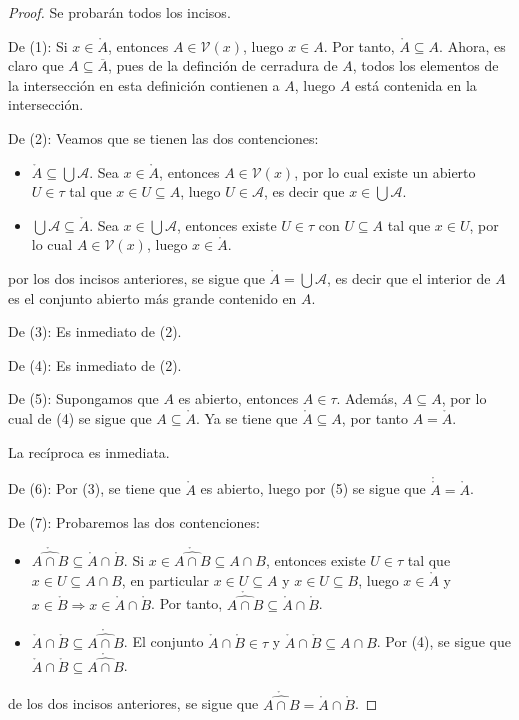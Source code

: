 \documentclass[12pt]{report}
\theoremstyle{largebreak}
\newcommand{\V}[1]{\ensuremath{\mathcal{V}(#1)}}
\newcommand{\Int}[1]{\ensuremath{\mathring{#1}}}
\newcommand{\Cls}[1]{\ensuremath{\overline{#1}}}
\begin{document}
    \begin{proof}
        Se probarán todos los incisos.

        De (1): Si $x\in\Int{A}$, entonces $A\in\V{x}$, luego $x\in A$. Por tanto, $\Int{A}\subseteq A$. Ahora, es claro que $A\subseteq \Cls{A}$, pues de la definción de cerradura de $A$, todos los elementos de la intersección en esta definición contienen a $A$, luego $A$ está contenida en la intersección.

        De (2): Veamos que se tienen las dos contenciones:
        \begin{itemize}
            \item $\Int{A}\subseteq\bigcup\mathcal{A}$. Sea $x\in \Int{A}$, entonces $A\in\V{x}$, por lo cual existe un abierto $U\in\tau$ tal que $x\in U\subseteq A$, luego $U\in\mathcal{A}$, es decir que $x\in \bigcup\mathcal{A}$.
            \item $\bigcup\mathcal{A}\subseteq\Int{A}$. Sea $x\in \bigcup\mathcal{A}$, entonces existe $U\in\tau$ con $U\subseteq A$ tal que $x\in U$, por lo cual $A\in\V{x}$, luego $x\in\Int{A}$.
        \end{itemize}
        por los dos incisos anteriores, se sigue que $\Int{A}=\bigcup\mathcal{A}$, es decir que el interior de $A$ es el conjunto abierto más grande contenido en $A$.

        De (3): Es inmediato de (2).

        De (4): Es inmediato de (2).

        De (5): Supongamos que $A$ es abierto, entonces $A\in\tau$. Además, $A\subseteq A$, por lo cual de (4) se sigue que $A\subseteq\Int{A}$. Ya se tiene que $\Int{A}\subseteq A$, por tanto $A=\Int{A}$.

        La recíproca es inmediata.

        De (6): Por (3), se tiene que $\Int{A}$ es abierto, luego por (5) se sigue que $\Int{\Int{A}}=\Int{A}$.

        De (7): Probaremos las dos contenciones:
        \begin{itemize}
            \item $\Int{\widehat{A\cap B}}\subseteq\Int{A}\cap\Int{B}$. Si $x\in\Int{\widehat{A\cap B}}\subseteq A\cap B$, entonces existe $U\in\tau$ tal que $x\in U\subseteq A\cap B$, en particular $x\in U\subseteq A$ y $x\in U\subseteq B$, luego $x\in \Int{A}$ y $x\in \Int{B}\Rightarrow x\in \Int{A}\cap\Int{B}$. Por tanto, $\Int{\widehat{A\cap B}}\subseteq\Int{A}\cap\Int{B}$.
            \item $\Int{A}\cap\Int{B}\subseteq\Int{\widehat{A\cap B}}$. El conjunto $\Int{A}\cap\Int{B}\in\tau$ y $\Int{A}\cap\Int{B}\subseteq A\cap B$. Por (4), se sigue que $\Int{A}\cap\Int{B}\subseteq\Int{\widehat{A\cap B}}$.
        \end{itemize}
        de los dos incisos anteriores, se sigue que $\Int{\widehat{A\cap B}}=\Int{A}\cap\Int{B}$.


\end{proof}
\end{document}

